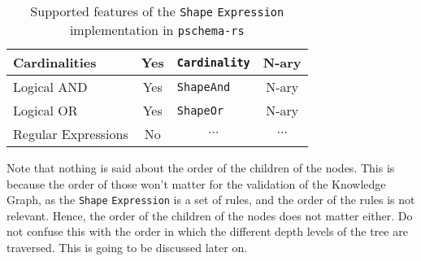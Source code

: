 \begin{table}[ht]
\begin{tabular}{|l|c|l|c|}
        Cardinalities                                                  & {\color[HTML]{009901} Yes} & \texttt{Cardinality}                                                         & N-ary                                                               \\ \hline
        Logical AND                                                    & {\color[HTML]{009901} Yes} & \texttt{ShapeAnd}                                                            & N-ary                                                               \\ \hline
        Logical OR                                                     & {\color[HTML]{009901} Yes} & \texttt{ShapeOr}                                                             & N-ary                                                               \\ \hline
        Regular Expressions                                            & {\color[HTML]{FE0000} No}  & \multicolumn{1}{c|}{$\cdots$}                                                & \multicolumn{1}{c|}{$\cdots$}                                       \\ \hline
    \end{tabular}
    \caption{Supported features of the \texttt{Shape} \texttt{Expression} implementation in \texttt{pschema-rs}}
\end{table}


Note that nothing is said about the order of the children of the nodes. This is because the order of those won't matter for the validation of the Knowledge Graph, as the \texttt{Shape} \texttt{Expression} is a set of rules, and the order of the rules is not relevant. Hence, the order of the children of the nodes does not matter either. Do not confuse this with the order in which the different depth levels of the tree are traversed. This is going to be discussed later on.

